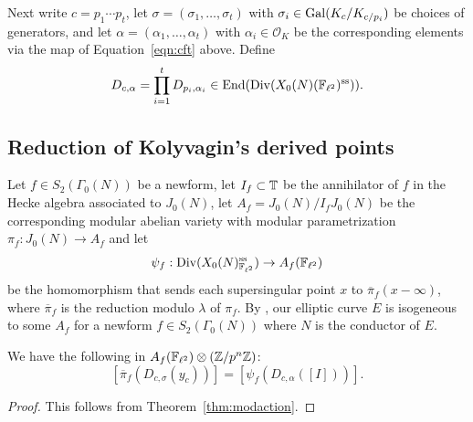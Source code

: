 \documentclass{article} \usepackage[active]{srcltx}
\renewcommand{\O}{\mathcal{O}}
\DeclareMathOperator{\supersingular}{ss}
\renewcommand{\ss}{\supersingular}
\begin{document}
Next write $c=p_1 \cdots p_t$,
let $\sigma = (\sigma_1, \ldots, \sigma_t)$ with
$\sigma_i \in \operatorname{Gal}(K_c/K_{c/p_i})$
be choices of generators, and let
$\alpha=(\alpha_1,\ldots,\alpha_t)$ with
$\alpha_i \in \O_K$ be the corresponding elements
via the map of Equation~\ref{eqn:cft} above. 
Define 
$$
  D_{c,\alpha} = \prod_{i=1}^t D_{p_i, \alpha_i}
 \in \End(\Div(X_0(N)(\F_{\ell^2})^{\ss})).
$$


\subsection{Reduction of Kolyvagin's derived points}\label{sec:redkoly}
Let $f\in S_2(\Gamma_0(N))$ be a newform, let $I_f\subset \mathbb{T}$ be the
annihilator of $f$ in the Hecke algebra associated to $J_0(N)$, let
$A_f = J_0(N)/I_f J_0(N)$ be the corresponding modular abelian
variety with modular parametrization $\pi_f:J_0(N)\to A_f$ and let
$$
 \psi_f:\Div(X_0(N)_{\F_{\ell^2}}^{\ss}) \to A_f(\F_{\ell^2})
$$
be the homomorphism that sends each supersingular point $x$ to
$\overline{\pi}_f(x-\infty)$, where $\overline{\pi}_f$ is the
reduction modulo $\lambda$ of $\pi_f$.  By
\cite{breuil-conrad-diamond-taylor}, our elliptic curve $E$ is
isogeneous to some $A_f$ for a newform $f\in S_2(\Gamma_0(N))$ where
$N$ is the conductor of $E$. 


\begin{theorem}\label{thm:redonlyK1}
We have the following in $A_f(\mathbb{F}_{\ell^2}) \otimes (\mathbb{Z}/p^n\mathbb{Z})$:
$$
[\overline{\pi}_f (D_{c,\sigma}(y_c))] = 
  [\psi_f \left(D_{c,\alpha} ([I] ) \right)].
$$
\end{theorem}
\begin{proof}
  This follows from Theorem~\ref{thm:modaction}. 
\end{proof}
\end{document}
